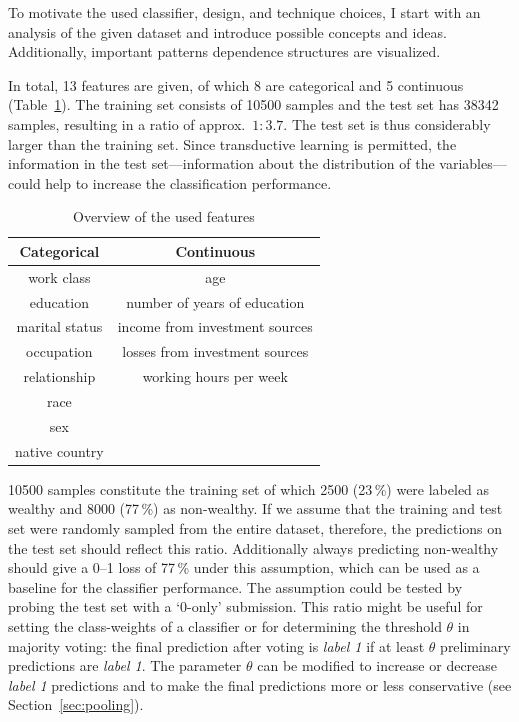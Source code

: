 \documentclass[a4paper]{article}
\begin{document}
To motivate the used classifier, design, and technique choices, I
start with an analysis of the given dataset and introduce possible
concepts and ideas. Additionally, important patterns dependence
structures are visualized.

In total, 13 features are given, of which 8 are categorical and 5
continuous (Table~\ref{tab:features}).
The training set consists of 10500 samples and the test set has 38342
samples, resulting in a ratio of approx.\ $1:3.7$.  The test set is
thus considerably larger than the training set.
Since transductive learning is permitted, the information in the test
set---information about the distribution of the variables---could help
to increase the classification performance.

\begin{table}[h]
  \centering
  \begin{tabular}{cc}
    \toprule
  Categorical  & Continuous                     \\
    \midrule
    work class & age                            \\
    education  & number of years of education   \\
marital status & income from investment sources \\
occupation     & losses from investment sources \\
relationship   & working hours per week         \\
race           &                                \\
sex            &                                \\
native country &                                \\
      \bottomrule
  \end{tabular}
  \caption{{Overview of the used features}}
  \label{tab:features}
\end{table}

10500 samples constitute the training set of which 2500 (23\,\%) were
labeled as wealthy and 8000 (77\,\%) as non-wealthy. If we assume that
the training and test set were randomly sampled from the entire
dataset, therefore, the predictions on the test set should reflect
this ratio. Additionally always predicting non-wealthy should give a
0--1 loss of 77\,\% under this assumption, which can be used as a
baseline for the classifier performance. The assumption could be
tested by probing the test set with a `0-only' submission. This ratio
might be useful for setting the class-weights of a classifier or for
determining the threshold $\theta$ in majority voting: the final
prediction after voting is \emph{label 1} if at least $\theta$
preliminary predictions are \emph{label 1}. The parameter $\theta$ can
be modified to increase or decrease \emph{label 1} predictions and to
make the final predictions more or less conservative (see
Section~\ref{sec:pooling}).
\end{document}
